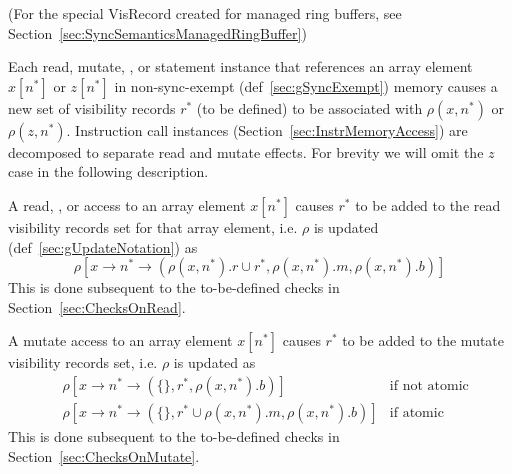 

(For the special \textsf{VisRecord} created for managed ring buffers, see Section~\ref{sec:SyncSemanticsManagedRingBuffer})

Each read, mutate, , or  statement instance that references an array element $x[n^*]$ or $z[n^*]$ in non-sync-exempt (def~\ref{sec:gSyncExempt}) memory causes a new set of visibility records $r^*$ (to be defined) to be associated with $\rho(x, n^*)$ or $\rho(z, n^*)$.
Instruction call instances (Section~\ref{sec:InstrMemoryAccess}) are decomposed to separate read and mutate effects.
For brevity we will omit the $z$ case in the following description.

A read, , or  access to an array element $x[n^*]$ causes $r^*$ to be added to the read visibility records set for that array element, i.e. $\rho$ is updated (def~\ref{sec:gUpdateNotation}) as
\begin{equation*}
    \rho[x \to n^* \to (\rho(x, n^*).r \cup r^*, \rho(x, n^*).m, \rho(x, n^*).b)]
\end{equation*}
This is done subsequent to the to-be-defined checks in Section~\ref{sec:ChecksOnRead}.

A mutate access to an array element $x[n^*]$ causes $r^*$ to be added to the mutate visibility records set, i.e. $\rho$ is updated as
\begin{align*}
    & \rho[x \to n^* \to (\{\}, r^*, \rho(x, n^*).b)] & \text{if not atomic} \\
    & \rho[x \to n^* \to (\{\}, r^* \cup \rho(x, n^*).m, \rho(x, n^*).b)] & \text{if atomic}
\end{align*}
This is done subsequent to the to-be-defined checks in Section~\ref{sec:ChecksOnMutate}.

